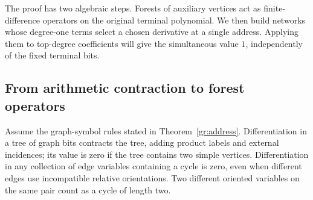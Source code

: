 The proof has two algebraic steps.  Forests of auxiliary vertices act as
finite-difference operators on the original terminal polynomial.  We then
build networks whose degree-one terms select a chosen derivative at a
single address.  Applying them to top-degree coefficients will give the
simultaneous value $1$, independently of the fixed terminal bits.

\subsection{From arithmetic contraction to forest operators}

\begin{lemma}\label{gr:forest}
Assume the graph-symbol rules stated in Theorem~\ref{gr:address}.
Differentiation in a tree of graph
bits contracts the tree, adding product labels and external incidences;
its value is zero if the tree contains two simple vertices.  Differentiation
in any collection of edge variables containing a cycle is zero, even when
different edges use incompatible relative orientations.  Two different
oriented variables on the same pair count as a cycle of length two.
\end{lemma}

